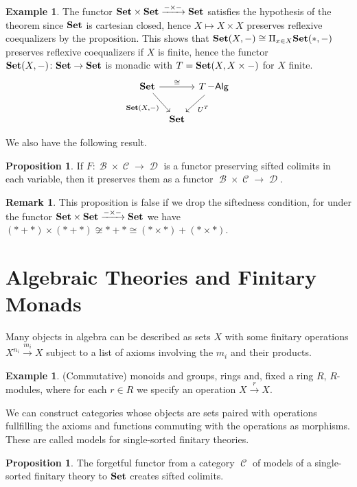 \documentclass[a4paper,11pt,oneside,openany]{scrbook}
\newcommand{\catname}[1]{{\normalfont\textbf{#1}}}
\DeclareMathOperator{\Alg}{-\mathsf{Alg}}
\newcommand{\Set}{\catname{Set}}
\DeclareMathOperator{\B}{\mathcal{B}}
\DeclareMathOperator{\C}{\mathcal{C}}
\DeclareMathOperator{\D}{\mathcal{D}}
\theoremstyle{definition}
\theoremstyle{definition}
\newtheorem{prop}[thm]{Proposition}
\newtheorem{rmk}[thm]{Remark}
\newtheorem{exmp}[thm]{Example}
\begin{document}
\begin{exmp}
	The functor $\Set\times\Set\xrightarrow{-\times-}\Set$ satisfies the hypothesis of the theorem since $\Set$ is cartesian closed, hence $X\mapsto X\times X$ preserves reflexive coequalizers by the proposition. This shows that $\Set(X,-)\cong\Pi_{x\in X}\Set(*,-)$ preserves reflexive coequalizers if $X$ is finite, hence the functor $\Set(X,-)\colon\Set\rightarrow\Set$ is monadic with $T=\Set(X,X\times-)$ for $X$ finite.
	\[
	\begin{tikzcd}[column sep=tiny]
	\Set\ar[rr, "\cong"] \ar[dr, swap, "{\Set(X,-)}"]
	&& T\Alg\ar[dl, "U^T"] \\
	& \Set
	\end{tikzcd}
	\]
\end{exmp}

We also have the following result.

\begin{prop}
	If $F\colon\B\times\C\rightarrow\D$ is a functor preserving sifted colimits in each variable, then it preserves them as a functor $\B\times\C\rightarrow\D$.
\end{prop}

\begin{rmk}
	This proposition is false if we drop the siftedness condition, for under the functor $\Set\times\Set\xrightarrow{-\times-}\Set$ we have $(*+*)\times (*+*)\not\cong *+*\cong (*\times*)+(*\times *)$.
\end{rmk}

\section{Algebraic Theories and Finitary Monads}

Many objects in algebra can be described as sets $X$ with some finitary operations $X^{n_i}\xrightarrow{m_i}X$ subject to a list of axioms involving the $m_i$ and their products.

\begin{exmp}
	(Commutative) monoids and groups, rings and, fixed a ring $R$, $R$-modules, where for each $r\in R$ we specify an operation $X\xrightarrow{r}X$.
\end{exmp}

We can construct categories whose objects are sets paired with operations fullfilling the axioms and functions commuting with the operations as morphisms. These are called models for single-sorted finitary theories.

\begin{prop}
	The forgetful functor from a category $\C$ of models of a single-sorted finitary theory to $\Set$ creates sifted colimits.
\end{prop}
\end{document}
